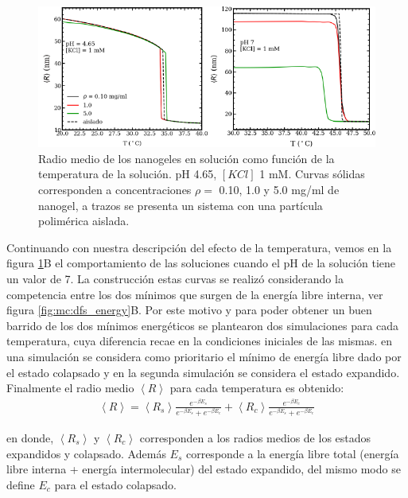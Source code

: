 	\begin{figure}[!htb]
		\centering
		\includegraphics[width=0.99\linewidth]{Figures/graph-mc/rvst.pdf}
		\caption{Radio medio de los nanogeles en soluci\'on como funci\'on de la temperatura de la soluci\'on. pH 4.65, $[KCl]$ 1 mM. Curvas s\'olidas corresponden a concentraciones $\rho =$ 0.10, 1.0 y 5.0 mg/ml de nanogel, a trazos se presenta un sistema con una part\'icula polim\'erica aislada.}
		\label{fig:mc:temperatura-r}
	\end{figure}
	
    Continuando con nuestra descripci\'on del efecto de la temperatura, vemos en la figura \ref{fig:mc:temperatura-r}B el comportamiento de las soluciones cuando el pH de la soluci\'on tiene un valor de 7. La construcci\'on estas curvas se realiz\'o considerando la competencia entre los dos m\'inimos que surgen de la energ\'ia libre interna, ver figura \ref{fig:mc:dfs_energy}B.  Por este motivo y para poder obtener un buen barrido de los dos m\'inimos energ\'eticos se plantearon dos simulaciones para cada temperatura, cuya diferencia recae en la condiciones iniciales de las mismas. en una simulaci\'on se considera como prioritario el m\'inimo de energ\'ia libre dado por el estado colapsado y en la segunda simulaci\'on se considera el estado expandido.
Finalmente el radio medio $\left< R\right>$ para cada temperatura es obtenido:
\begin{align}
	\left< R \right> =  \left< R_s\right>\frac{e^{-\beta E_s}}{e^{-\beta E_s}+ e^{-\beta E_c}} + \left< R_c\right>\frac{e^{-\beta E_c}}{e^{-\beta E_s}+ e^{-\beta E_c}} 
\end{align}

\noindent en donde, $\left< R_s\right>$ y $\left< R_c \right>$ corresponden a los radios medios de los estados expandidos y colapsado. Adem\'as $E_s$ corresponde a la energ\'ia libre total (energ\'ia libre interna + energ\'ia intermolecular) del estado expandido, del mismo modo se define $E_c$ para el estado colapsado.


